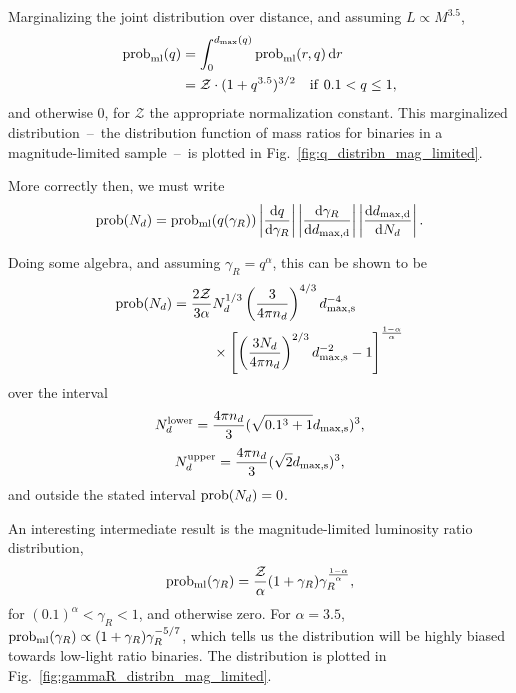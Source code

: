 \documentclass{emulateapj}
\begin{document}
Marginalizing the joint distribution over distance, and assuming $L\propto 
M^{3.5}$,
\begin{align}
{\rm prob}_{\rm ml}(q) &= 
\int_{0}^{d_{\rm max}(q)} {\rm prob}_{\rm ml}(r,q) \,{\rm d}r \\
&= \mathcal{Z}\cdot (1+q^{3.5})^{3/2}\quad {\rm if\ }0.1<q\leq 1,
\label{eq:pdf_q_mag_limited}
\end{align}
and otherwise 0, for $\mathcal{Z}$ the appropriate normalization constant.
This marginalized distribution~--~the distribution function of mass ratios for 
binaries in a magnitude-limited sample~--~is plotted in 
Fig.~\ref{fig:q_distribn_mag_limited}.

More correctly then, we must write
\begin{equation}
{\rm prob}(N_d) = {\rm prob_{ml}}(q(\gamma_R)) 
\left| \frac{{\rm d}q}{{\rm d}\gamma_R}  \right|
\left| \frac{{\rm d}\gamma_R}{{\rm d}d_{\rm max,d}}  \right|				
\left| \frac{{\rm d}d_{\rm max,d}}{{\rm d}N_d}  \right|.
\end{equation}

Doing some algebra, and assuming $\gamma_R = q^\alpha$, this can be shown to be
\begin{align}
{\rm prob}(N_d) = \frac{2\mathcal{Z}}{3\alpha}& N_d^{1/3} \left(\frac{3}{4\pi 
	n_d}\right)^{4/3} d_{\rm max,s}^{-4} \ \nonumber\\
&\times \left[ 
	\left(\frac{3 N_d}{4\pi n_d}\right)^{2/3}  d_{\rm max,s}^{-2} - 1
 \right]^{\frac{1-\alpha}{\alpha} }
\end{align}
over the interval
\begin{equation}
N_d^{\rm lower} = \frac{4 \pi n_d}{3} (\sqrt{0.1^3 + 1} d_{\rm max,s})^3,
\end{equation}
\begin{equation}
N_d^{\rm upper} = \frac{4 \pi n_d}{3} (\sqrt{2}d_{\rm max,s})^3,
\end{equation}
and outside the stated interval ${\rm prob}(N_d) = 0$.

An interesting intermediate result is the magnitude-limited luminosity ratio 
distribution,
\begin{equation}
{\rm prob_{ml}}(\gamma_R) = \frac{\mathcal{Z}}{\alpha} (1+\gamma_R) 
\gamma_R^{\frac{1-\alpha}{\alpha}},
\end{equation}
for $(0.1)^{\alpha}<\gamma_R<1$, and otherwise zero.
For $\alpha=3.5$, ${\rm prob_{ml}}(\gamma_R) \propto 
(1+\gamma_R)\gamma_R^{-5/7}$, which tells us the distribution will be highly 
biased towards low-light ratio binaries.
The distribution is plotted in Fig.~\ref{fig:gammaR_distribn_mag_limited}.
\end{document}
